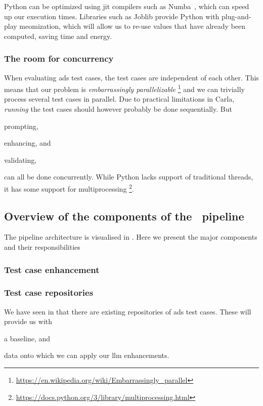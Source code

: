 Python can be optimized using \acrfull{jit} compilers such as Numba~\cite{numba}, which can speed up
our execution times. Libraries such as Joblib provide Python with plug-and-play
meomization, which will allow us to re-use values that have already been
computed, saving time and energy.

\subsubsection{The room for concurrency}

When evaluating \acrshort{ads} test cases, the test cases are independent of each
other. This means that our problem is \textit{embarrassingly parallelizable}
\footnote{\url{https://en.wikipedia.org/wiki/Embarrassingly_parallel}} and we can
trivially process several test cases in parallel. Due to practical limitations
in Carla, \textit{running} the test cases should however probably be done
sequentially. But \begin{inparaenum}
    \item prompting,
    \item enhancing, and
    \item validating,
\end{inparaenum}
can all be done concurrently. While Python lacks support of traditional threads,
it has some support for multiprocessing
\footnote{\url{https://docs.python.org/3/library/multiprocessing.html}}.

\subsection{Overview of the components of the \hefe~pipeline}

The pipeline architecture is visualised in . Here we
present the major components and their responsibilities


\subsubsection{Test case enhancement}

\subsubsection{Test case repositories}

We have seen in  that there are existing repositories of
\acrshort{ads} test cases. These will provide us with \begin{inparaenum}
    \item a baseline,
    and
    \item data onto which we can apply our \acrshort{llm} enhancements.
\end{inparaenum}

